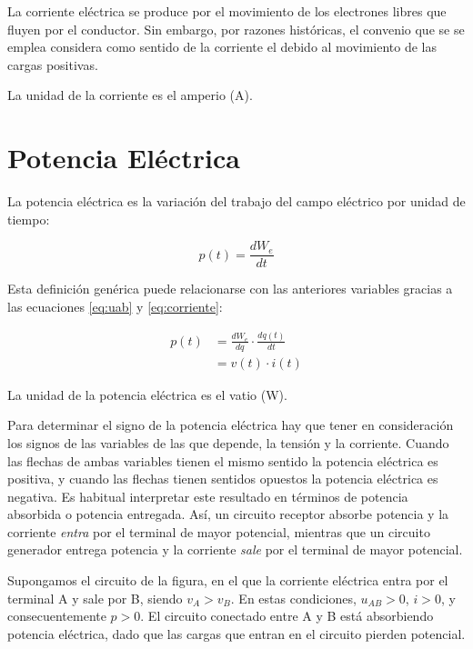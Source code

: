 La corriente eléctrica se produce por el movimiento de los electrones libres que fluyen por el conductor. Sin embargo, por razones históricas, el convenio que se se emplea considera como sentido de la corriente el debido al movimiento de las cargas positivas.

La unidad de la corriente es el amperio (A).
\section{Potencia Eléctrica}
\label{sec:potencia}

La potencia eléctrica es la variación del trabajo del campo eléctrico por unidad de tiempo:

\begin{equation}
  \label{eq:potencia_general}
  p(t)=\frac{dW_{e}}{dt}
\end{equation}

Esta definición genérica puede relacionarse con las anteriores variables gracias a las ecuaciones \ref{eq:uab} y \ref{eq:corriente}:

\begin{align}
  \label{eq:potencia_vi}
  p(t) &= \frac{dW_e}{dq} \cdot \frac{dq(t)}{dt}\\
       &= v(t)\cdot i(t)
\end{align}

La unidad de la potencia eléctrica es el vatio (W).

Para determinar el signo de la potencia eléctrica hay que tener en consideración los signos de las variables de las que depende, la tensión y la corriente. Cuando las flechas de ambas variables tienen el mismo sentido la potencia eléctrica es positiva, y cuando las flechas tienen sentidos opuestos la potencia eléctrica es negativa. Es habitual interpretar este resultado en términos de potencia absorbida o potencia entregada. Así, un circuito receptor absorbe potencia y la corriente \emph{entra} por el terminal de mayor potencial, mientras que un circuito generador entrega potencia y la corriente \emph{sale} por el terminal de mayor potencial.

Supongamos el circuito de la figura, en el que la corriente eléctrica entra por el terminal A y sale por B, siendo $v_A > v_B$. En estas condiciones, $u_{AB} > 0$, $i > 0$, y consecuentemente $p > 0$.  El circuito conectado entre A y B está absorbiendo potencia eléctrica, dado que las cargas que entran en el circuito pierden potencial.

